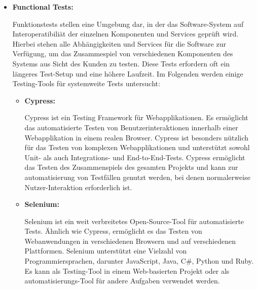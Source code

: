 \begin{itemize}
    \item {
        \textbf{Functional Tests:}\par
        Funktionstests stellen eine Umgebung dar, in der das Software-System auf Interoperatibiliät der
        einzelnen Komponenten und Services geprüft wird.
        Hierbei stehen alle Abhängigkeiten und Services für die Software zur Verfügung, um das Zusammespiel von
        verschiedenen Komponenten des Systems aus Sicht des Kunden zu testen.
        Diese Tests erfordern oft ein längeres Test-Setup und eine höhere Laufzeit.
        Im Folgenden werden einige Testing-Tools für systemweite Tests untersucht:

        \begin{itemize}
            \item {
                \textbf{Cypress:}\par
                Cypress ist ein Testing Framework für Webapplikationen.
                Es ermöglicht das automatisierte Testen von Benutzerinteraktionen innerhalb einer Webapplikation in
                einem realen Browser.
                Cypress ist besonders nützlich für das Testen von komplexen Webapplikationen und unterstützt sowohl
                Unit- als auch Integrations- und End-to-End-Tests.
                Cypress ermöglicht das Testen des Zusammenspiels des gesamten Projekts und kann zur automatisierung
                von Testfällen genutzt werden, bei denen normalerweise Nutzer-Interaktion erforderlich ist.
            }

            \item {
                \textbf{Selenium:}\par
                Selenium ist ein weit verbreitetes Open-Source-Tool für automatisierte Tests.
                Ähnlich wie Cypress, ermöglicht es das Testen von Webanwendungen in verschiedenen Browsern und auf
                verschiedenen Plattformen.
                Selenium unterstützt eine Vielzahl von Programmiersprachen, darunter JavaScript, Java, C\#, Python und
                Ruby.
                Es kann als Testing-Tool in einem Web-basierten Projekt oder als automatisierungs-Tool für andere
                Aufgaben verwendet werden.
            }
        \end{itemize}
    }


\end{itemize}
